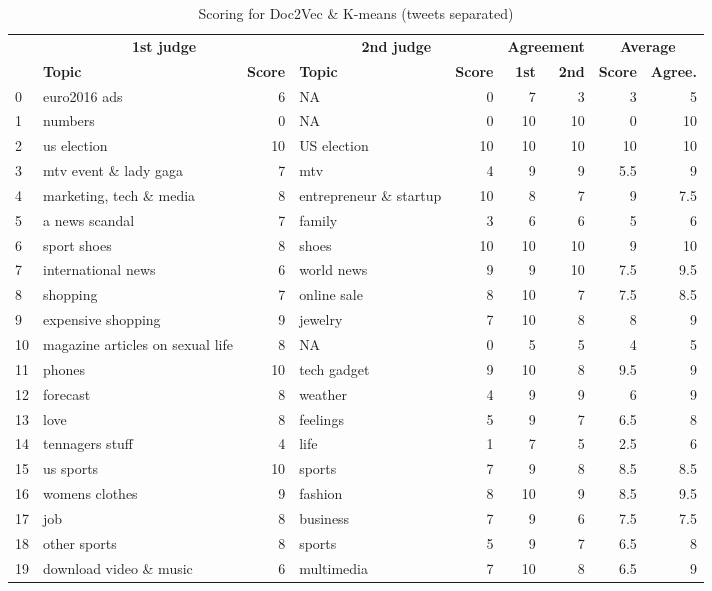 \documentclass[11pt]{article}
\begin{document}
\begin{appendices}
\begin{table}[H]
	\centering
	\begin{tabular}{| l | p{2.7cm} | r | p{2.7cm} | r | r | r | r | r |}
		\hline
		& \multicolumn{2}{c|}{\textbf{1st judge}} & \multicolumn{2}{c|}{\textbf{2nd judge}} & \multicolumn{2}{c|}{\textbf{Agreement}} & \multicolumn{2}{c|}{\textbf{Average}}\\
        \cline{2-9}
         & \textbf{Topic} & \textbf{Score} & \textbf{Topic} & \textbf{Score} & \textbf{1st} & \textbf{2nd} & \textbf{Score} & \textbf{Agree.}\\
		\hline
            0 & euro2016 ads & 6 & NA & 0 & 7 & 3 & 3 & 5\\
            1 & numbers & 0 & NA & 0 & 10 & 10 & 0 & 10\\
            2 & us election & 10 & US election & 10 & 10 & 10 & 10 & 10\\
            3 & mtv event \& lady gaga & 7 & mtv & 4 & 9 & 9 & 5.5 & 9\\
            4 & marketing, tech \& media & 8 & entrepreneur \& startup & 10 & 8 & 7 & 9 & 7.5\\
            5 & a news scandal & 7 & family & 3 & 6 & 6 & 5 & 6\\
            6 & sport shoes & 8 & shoes & 10 & 10 & 10 & 9 & 10\\
            7 & international news & 6 & world news & 9 & 9 & 10 & 7.5 & 9.5\\
            8 & shopping & 7 & online sale & 8 & 10 & 7 & 7.5 & 8.5\\
            9 & expensive shopping & 9 & jewelry & 7 & 10 & 8 & 8 & 9\\
            10 & magazine articles on sexual life & 8 & NA & 0 & 5 & 5 & 4 & 5\\
            11 & phones & 10 & tech gadget & 9 & 10 & 8 & 9.5 & 9\\
            12 & forecast & 8 & weather & 4 & 9 & 9 & 6 & 9\\
            13 & love & 8 & feelings & 5 & 9 & 7 & 6.5 & 8\\
            14 & tennagers stuff & 4 & life & 1 & 7 & 5 & 2.5 & 6\\
            15 & us sports & 10 & sports & 7 & 9 & 8 & 8.5 & 8.5\\
            16 & womens clothes & 9 & fashion & 8 & 10 & 9 & 8.5 & 9.5\\
            17 & job & 8 & business & 7 & 9 & 6 & 7.5 & 7.5\\
            18 & other sports & 8 & sports & 5 & 9 & 7 & 6.5 & 8\\
            19 & download video \& music & 6 & multimedia & 7 & 10 & 8 & 6.5 & 9\\
		\hline
	\end{tabular}
	\caption{Scoring for Doc2Vec \& K-means (tweets separated)}
	\label{tb:res_doc_sep}
\end{table}


\end{appendices}
\end{document}
